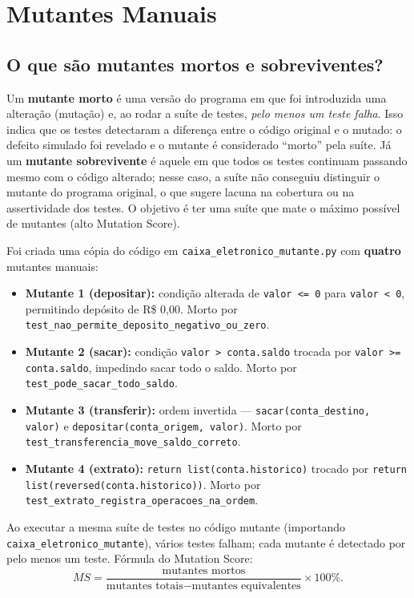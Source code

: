 \documentclass[11pt,a4paper]{article}
\begin{document}
\section{Mutantes Manuais}

\subsection*{O que são mutantes mortos e sobreviventes?}

Um \textbf{mutante morto} é uma versão do programa em que foi introduzida uma alteração (mutação) e, ao rodar a suíte de testes, \emph{pelo menos um teste falha}. Isso indica que os testes detectaram a diferença entre o código original e o mutado: o defeito simulado foi revelado e o mutante é considerado ``morto'' pela suíte. Já um \textbf{mutante sobrevivente} é aquele em que todos os testes continuam passando mesmo com o código alterado; nesse caso, a suíte não conseguiu distinguir o mutante do programa original, o que sugere lacuna na cobertura ou na assertividade dos testes. O objetivo é ter uma suíte que mate o máximo possível de mutantes (alto Mutation Score).

Foi criada uma cópia do código em \texttt{caixa\_eletronico\_mutante.py} com \textbf{quatro} mutantes manuais:

\begin{itemize}
  \item \textbf{Mutante 1 (depositar):} condição alterada de \texttt{valor <= 0} para \texttt{valor < 0}, permitindo depósito de R\$ 0,00. Morto por \texttt{test\_nao\_permite\_deposito\_negativo\_ou\_zero}.
  \item \textbf{Mutante 2 (sacar):} condição \texttt{valor > conta.saldo} trocada por \texttt{valor >= conta.saldo}, impedindo sacar todo o saldo. Morto por \texttt{test\_pode\_sacar\_todo\_saldo}.
  \item \textbf{Mutante 3 (transferir):} ordem invertida --- \texttt{sacar(conta\_destino, valor)} e \texttt{depositar(conta\_origem, valor)}. Morto por \texttt{test\_transferencia\_move\_saldo\_correto}.
  \item \textbf{Mutante 4 (extrato):} \texttt{return list(conta.historico)} trocado por \texttt{return list(reversed(conta.historico))}. Morto por \texttt{test\_extrato\_registra\_operacoes\_na\_ordem}.
\end{itemize}

Ao executar a mesma suíte de testes no código mutante (importando \texttt{caixa\_eletronico\_mutante}), vários testes falham; cada mutante é detectado por pelo menos um teste. Fórmula do Mutation Score:
\[
MS = \frac{\text{mutantes mortos}}{\text{mutantes totais} - \text{mutantes equivalentes}} \times 100\%.
\]
\end{document}
